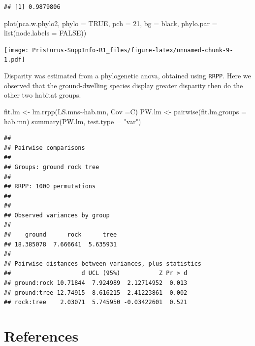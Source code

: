 \documentclass[
  11pt,
]{article}
\newenvironment{Shaded}{\begin{snugshade}}{\end{snugshade}}
\newcommand{\AttributeTok}[1]{\textcolor[rgb]{0.77,0.63,0.00}{#1}}
\newcommand{\ConstantTok}[1]{\textcolor[rgb]{0.00,0.00,0.00}{#1}}
\newcommand{\DecValTok}[1]{\textcolor[rgb]{0.00,0.00,0.81}{#1}}
\newcommand{\FunctionTok}[1]{\textcolor[rgb]{0.00,0.00,0.00}{#1}}
\newcommand{\NormalTok}[1]{#1}
\newcommand{\OtherTok}[1]{\textcolor[rgb]{0.56,0.35,0.01}{#1}}
\newcommand{\SpecialCharTok}[1]{\textcolor[rgb]{0.00,0.00,0.00}{#1}}
\newcommand{\StringTok}[1]{\textcolor[rgb]{0.31,0.60,0.02}{#1}}
\begin{document}
\begin{verbatim}
## [1] 0.9879806
\end{verbatim}

\begin{Shaded}
\begin{Highlighting}[]
\FunctionTok{plot}\NormalTok{(pca.w.phylo2, }\AttributeTok{phylo =} \ConstantTok{TRUE}\NormalTok{, }\AttributeTok{pch =} \DecValTok{21}\NormalTok{, }\AttributeTok{bg =} \StringTok{\textquotesingle{}black\textquotesingle{}}\NormalTok{, }
     \AttributeTok{phylo.par =} \FunctionTok{list}\NormalTok{(}\AttributeTok{node.labels =} \ConstantTok{FALSE}\NormalTok{))}
\end{Highlighting}
\end{Shaded}

\texttt{[image: Pristurus-SuppInfo-R1\_files/figure-latex/unnamed-chunk-9-1.pdf]}

Disparity was estimated from a phylogenetic anova, obtained using
\texttt{RRPP}. Here we observed that the ground-dwelling species display
greater disparity then do the other two habitat groups.

\begin{Shaded}
\begin{Highlighting}[]
\NormalTok{fit.lm }\OtherTok{\textless{}{-}} \FunctionTok{lm.rrpp}\NormalTok{(LS.mns}\SpecialCharTok{\textasciitilde{}}\NormalTok{hab.mn, }\AttributeTok{Cov =}\NormalTok{C)}
\NormalTok{PW.lm }\OtherTok{\textless{}{-}} \FunctionTok{pairwise}\NormalTok{(fit.lm,}\AttributeTok{groups =}\NormalTok{ hab.mn)}
\FunctionTok{summary}\NormalTok{(PW.lm, }\AttributeTok{test.type =} \StringTok{"var"}\NormalTok{)}
\end{Highlighting}
\end{Shaded}

\begin{verbatim}
## 
## Pairwise comparisons
## 
## Groups: ground rock tree 
## 
## RRPP: 1000 permutations
## 
## 
## Observed variances by group
## 
##    ground      rock      tree 
## 18.385078  7.666641  5.635931 
## 
## Pairwise distances between variances, plus statistics
##                    d UCL (95%)           Z Pr > d
## ground:rock 10.71844  7.924989  2.12714952  0.013
## ground:tree 12.74915  8.616215  2.41223861  0.002
## rock:tree    2.03071  5.745950 -0.03422601  0.521
\end{verbatim}

\newpage

\hypertarget{references}{%
\section*{References}\label{references}}
\end{document}
